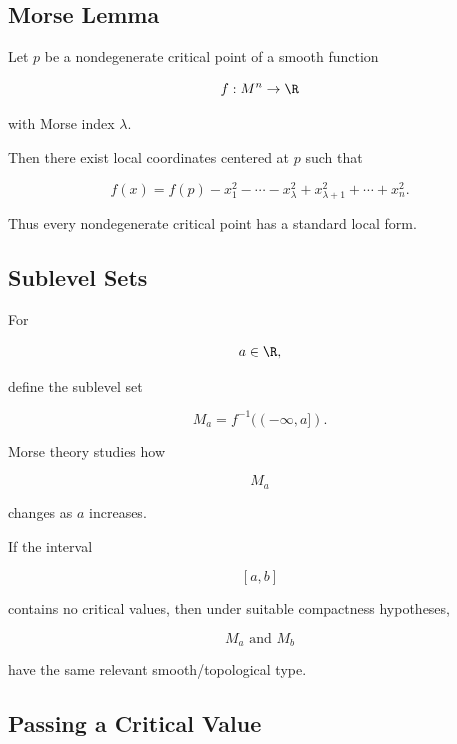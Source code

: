 \subsection{Morse Lemma}
\label{subsec:morse-lemma}

\begin{theorem}
Let \(p\) be a nondegenerate critical point of a smooth function

\[
f:M^n\to\R
\]

with Morse index \(\lambda\).

Then there exist local coordinates centered at \(p\) such that

\[
\boxed{
f(x)
=
f(p)
-
x_1^2-\cdots-x_\lambda^2
+
x_{\lambda+1}^2+\cdots+x_n^2.
}
\]
\end{theorem}

Thus every nondegenerate critical point has a standard local form.

\subsection{Sublevel Sets}
\label{subsec:morse-sublevel-sets}

For

\[
a\in\R,
\]

define the sublevel set

\[
\boxed{
M_a
=
f^{-1}((-\infty,a]).
}
\]

Morse theory studies how

\[
M_a
\]

changes as \(a\) increases.

If the interval

\[
[a,b]
\]

contains no critical values, then under suitable compactness hypotheses,

\[
\boxed{
M_a
\text{ and }
M_b
}
\]

have the same relevant smooth/topological type.

\subsection{Passing a Critical Value}
\label{subsec:passing-critical-value}

